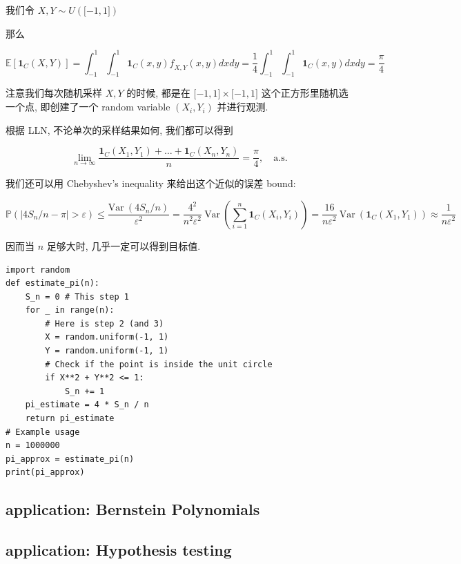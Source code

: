 \begin{example}[估算 \(\mathit{\pi}\)]

我们令 \(\mathit{X},\mathit{Y} \sim \mathit{U}(\lbrack - 1,1\rbrack)\)

那么

\[\mathbb{E}\left\lbrack {\mathbf{1}_{\mathit{C}}(\mathit{X},\mathit{Y})} \right\rbrack = \int_{- 1}^{1}\int_{- 1}^{1}\mathbf{1}_{\mathit{C}}(\mathit{x},\mathit{y})\mathit{f}_{\mathit{X},\mathit{Y}}(\mathit{x},\mathit{y})\mathit{d}\mathit{x}\mathit{d}\mathit{y} = \frac{1}{4}\int_{- 1}^{1}\int_{- 1}^{1}\mathbf{1}_{\mathit{C}}(\mathit{x},\mathit{y})\mathit{d}\mathit{x}\mathit{d}\mathit{y} = \frac{\mathit{\pi}}{4}\]

注意我们每次随机采样 \(\mathit{X},\mathit{Y}\) 的时候, 都是在 \(\lbrack - 1,1\rbrack \times \lbrack - 1,1\rbrack\) 这个正方形里随机选一个点, 即创建了一个 random variable \((\mathit{X}_{\mathit{i}},\mathit{Y}_{\mathit{i}})\) 并进行观测.

根据 LLN, 不论单次的采样结果如何, 我们都可以得到

\[\lim\limits_{\mathit{n}\rightarrow\infty}\frac{\mathbf{1}_{\mathit{C}}\left( {\mathit{X}_{1},\mathit{Y}_{1}} \right) + \ldots + \mathbf{1}_{\mathit{C}}\left( {\mathit{X}_{\mathit{n}},\mathit{Y}_{\mathit{n}}} \right)}{\mathit{n}} = \frac{\mathit{\pi}}{4},\quad\text{a.s.}\]

我们还可以用 Chebyshev's inequality 来给出这个近似的误差 bound:

\[\mathbb{P}\left( {\left| {4\mathit{S}_{\mathit{n}}/\mathit{n} - \mathit{\pi}} \right| > \mathit{\varepsilon}} \right) \leq \frac{\text{Var}\ \left( {4\mathit{S}_{\mathit{n}}/\mathit{n}} \right)}{\mathit{\varepsilon}^{2}} = \frac{4^{2}}{\mathit{n}^{2}\mathit{\varepsilon}^{2}}\ \text{Var}\ \left( {\sum\limits_{\mathit{i} = 1}^{\mathit{n}}\mathbf{1}_{\mathit{C}}\left( {\mathit{X}_{\mathit{i}},\mathit{Y}_{\mathit{i}}} \right)} \right) = \frac{16}{\mathit{n}\mathit{\varepsilon}^{2}}\ \text{Var}\ \left( {\mathbf{1}_{\mathit{C}}\left( {\mathit{X}_{1},\mathit{Y}_{1}} \right)} \right) \approx \frac{1}{\mathit{n}\mathit{\varepsilon}^{2}}\]

因而当 \(\mathit{n}\) 足够大时, 几乎一定可以得到目标值.

\begin{verbatim}
import random
def estimate_pi(n):
    S_n = 0 # This step 1
    for _ in range(n):
        # Here is step 2 (and 3)
        X = random.uniform(-1, 1)
        Y = random.uniform(-1, 1)
        # Check if the point is inside the unit circle
        if X**2 + Y**2 <= 1:
            S_n += 1
    pi_estimate = 4 * S_n / n
    return pi_estimate
# Example usage
n = 1000000
pi_approx = estimate_pi(n)
print(pi_approx)
\end{verbatim}

\end{example}

\subsection{application: Bernstein Polynomials}\label{application-bernstein-polynomials}

\subsection{application: Hypothesis testing}\label{application-hypothesis-testing}
